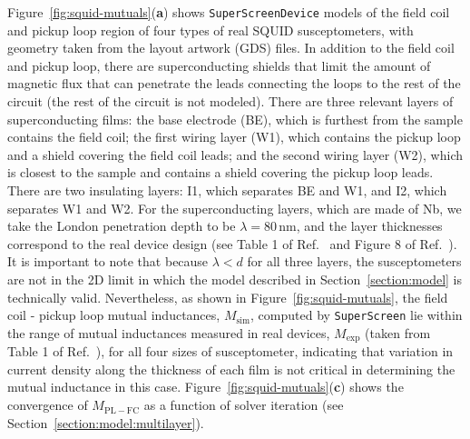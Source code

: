 \documentclass[final,3p,times,twocolumn]{elsarticle}
\newcommand{\inline}[1]{\texttt{#1}\xspace}
\newcommand{\SuperScreen}{\inline{SuperScreen}}
\newcommand{\nm}{\mathrm{nm}}
\begin{document}
Figure~\ref{fig:squid-mutuals}({\bf a}) shows \SuperScreen \inline{Device} models of the field coil and pickup loop region of four types of real SQUID susceptometers, with geometry taken from the layout artwork (GDS) files. In addition to the field coil and pickup loop, there are superconducting shields that limit the amount of magnetic flux that can penetrate the leads connecting the loops to the rest of the circuit (the rest of the circuit is not modeled). There are three relevant layers of superconducting films: the base electrode (BE), which is furthest from the sample contains the field coil; the first wiring layer (W1), which contains the pickup loop and a shield covering the field coil leads; and the second wiring layer (W2), which is closest to the sample and contains a shield covering the pickup loop leads. There are two insulating layers: I1, which separates BE and W1, and I2, which separates W1 and W2.
For the superconducting layers, which are made of Nb, we take the London penetration depth to be $\lambda = 80\,\nm$, and the layer thicknesses correspond to the real device design (see Table 1 of Ref.~\cite{Kirtley2016-gt} and Figure 8 of Ref.~\cite{Kirtley2016-zz}). It is important to note that because $\lambda < d$ for all three layers, the susceptometers are not in the 2D limit in which the model described in Section~\ref{section:model} is technically valid. Nevertheless, as shown in Figure~\ref{fig:squid-mutuals}, the field coil - pickup loop mutual inductances, $M_\mathrm{sim}$, computed by \SuperScreen lie within the range of mutual inductances measured in real devices, $M_\mathrm{exp}$ (taken from Table 1 of Ref.~\cite{Kirtley2016-zz}), for all four sizes of susceptometer, indicating that variation in current density along the thickness of each film is not critical in determining the mutual inductance in this case. Figure~\ref{fig:squid-mutuals}({\bf c}) shows the convergence of $M_\mathrm{PL-FC}$ as a function of solver iteration (see Section~\ref{section:model:multilayer}).
\end{document}
